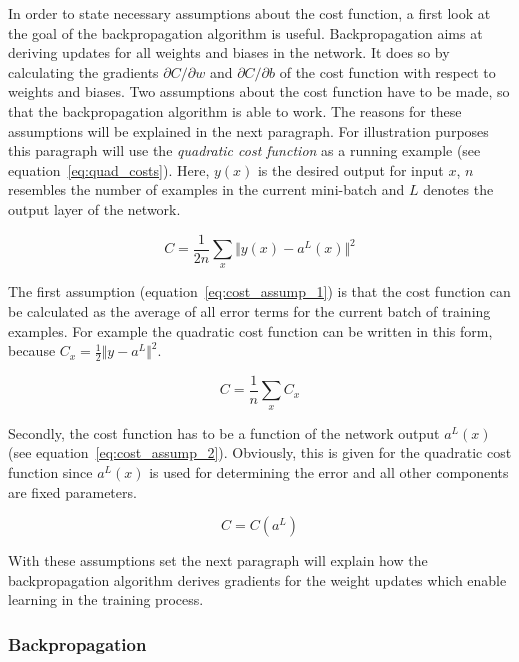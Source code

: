 In order to state necessary assumptions about the cost function, a first look
at the goal of the backpropagation algorithm is useful.
Backpropagation aims at deriving updates for all weights and biases in
the network.
It does so by calculating the gradients $\partial C / \partial w$ and 
$\partial C / \partial b$ of the cost function with respect to weights and
biases.
Two assumptions about the cost function have to be made, so that the 
backpropagation algorithm is able to work. 
The reasons for these assumptions will be explained in the next paragraph.
For illustration purposes this paragraph will use the \textit{quadratic cost function}
as a running example (see equation~\ref{eq:quad_costs}).
Here, $y(x)$ is the desired output for input $x$, $n$ resembles the number of
examples in the current mini-batch and $L$ denotes the output layer of the
network.

\begin{equation}
  \label{eq:quad_costs}
  C = \frac{1}{2n} \sum_x \Vert y(x) - a^L(x) \Vert^2
\end{equation}

The first assumption (equation~\ref{eq:cost_assump_1}) is that the cost function 
can be calculated as the average of all error terms for the current batch
of training examples. For example the quadratic cost function can be written in
this form, because $C_x = \frac{1}{2} \Vert y - a^L \Vert^2$.

\begin{equation}
  \label{eq:cost_assump_1}
  C = \frac{1}{n} \sum_x C_x
\end{equation}

Secondly, the cost function has to be a function of the network output $a^L(x)$
(see equation~\ref{eq:cost_assump_2}).
Obviously, this is given for the quadratic cost function since $a^L(x)$ is used
for determining the error and all other components are fixed parameters.

\begin{equation}
  \label{eq:cost_assump_2}
  C = C(a^L)
\end{equation}

With these assumptions set the next paragraph will explain how the
backpropagation algorithm derives gradients for the weight updates which enable
learning in the training process.

\subsubsection{Backpropagation}
\label{sub:backprop}

